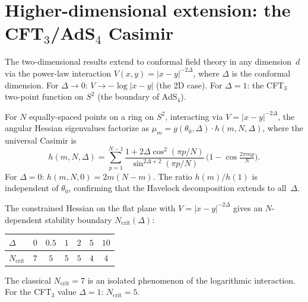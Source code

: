 
\section{Higher-dimensional extension: the CFT$_3$/AdS$_4$ Casimir}
\label{sec:cft3}

The two-dimensional results extend to conformal field theory in
any dimension~$d$ via the power-law interaction
$V(x,y) = |x - y|^{-2\Delta}$, where $\Delta$ is the conformal
dimension. For $\Delta \to 0$: $V \to -\log|x-y|$ (the 2D case).
For $\Delta = 1$: the CFT$_3$ two-point function on $S^2$
(the boundary of AdS$_4$).

\begin{proposition}
\label{prop:generalized-casimir}
For $N$ equally-spaced points on a ring on $S^2$,
interacting via $V = |x - y|^{-2\Delta}$,
the angular Hessian eigenvalues factorize as
$\mu_m = g(\theta_0, \Delta) \cdot h(m, N, \Delta)$,
where the universal Casimir is
\begin{equation}\label{eq:gen-casimir}
  h(m, N, \Delta) = \sum_{p=1}^{N-1}
    \frac{1 + 2\Delta\cos^2(\pi p/N)}
         {\sin^{2\Delta+2}(\pi p/N)}\,
    \bigl(1 - \cos\tfrac{2\pi mp}{N}\bigr).
\end{equation}
For $\Delta = 0$: $h(m, N, 0) = 2m(N{-}m)$.
The ratio $h(m)/h(1)$ is independent of $\theta_0$, confirming
that the Havelock decomposition extends to all~$\Delta$.
\end{proposition}

The constrained Hessian on the flat plane with $V = |x - y|^{-2\Delta}$
gives an $N$-dependent stability boundary $N_{\mathrm{crit}}(\Delta)$:

\begin{center}
\begin{tabular}{lcccccc}
\toprule
$\Delta$ & $0$ & $0.5$ & $1$ & $2$ & $5$ & $10$ \\
\midrule
$N_{\mathrm{crit}}$ & $7$ & $5$ & $5$ & $5$ & $4$ & $4$ \\
\bottomrule
\end{tabular}
\end{center}

The classical $N_{\mathrm{crit}} = 7$ is an isolated phenomenon
of the logarithmic interaction. For the CFT$_3$ value $\Delta = 1$:
$N_{\mathrm{crit}} = 5$.


